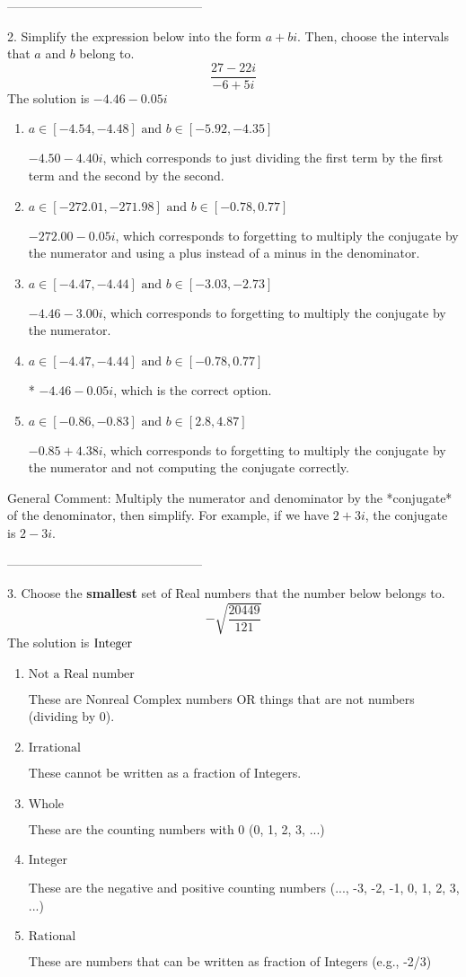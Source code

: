 \documentclass{extbook}[14pt]
\begin{document}
-----------------------------------------------

2. Simplify the expression below into the form $a+bi$. Then, choose the intervals that $a$ and $b$ belong to.
\[ \frac{27  - 22 i}{-6  + 5 i} \] 
The solution is $ -4.46  - 0.05 i $ 

\begin{enumerate}[label=\Alph*.] 
\item $ a \in [-4.54, -4.48] \text{ and } b \in [-5.92, -4.35] $ 

  $-4.50  - 4.40 i$, which corresponds to just dividing the first term by the first term and the second by the second. 
\item $ a \in [-272.01, -271.98] \text{ and } b \in [-0.78, 0.77] $ 

  $-272.00  - 0.05 i$, which corresponds to forgetting to multiply the conjugate by the numerator and using a plus instead of a minus in the denominator. 
\item $ a \in [-4.47, -4.44] \text{ and } b \in [-3.03, -2.73] $ 

  $-4.46  - 3.00 i$, which corresponds to forgetting to multiply the conjugate by the numerator. 
\item $ a \in [-4.47, -4.44] \text{ and } b \in [-0.78, 0.77] $ 

 * $-4.46  - 0.05 i$, which is the correct option. 
\item $ a \in [-0.86, -0.83] \text{ and } b \in [2.8, 4.87] $ 

  $-0.85  + 4.38 i$, which corresponds to forgetting to multiply the conjugate by the numerator and not computing the conjugate correctly. 
\end{enumerate} 
 
General Comment: Multiply the numerator and denominator by the *conjugate* of the denominator, then simplify. For example, if we have $2+3i$, the conjugate is $2-3i$.

-----------------------------------------------

3. Choose the \textbf{smallest} set of Real numbers that the number below belongs to.
\[ -\sqrt{\frac{20449}{121}} \] 
The solution is $ \text{\text{Integer}} $ 

\begin{enumerate}[label=\Alph*.] 
\item $ \text{Not a Real number} $ 

 These are Nonreal Complex numbers OR things that are not numbers (dividing by 0). 
\item $ \text{Irrational} $ 

 These cannot be written as a fraction of Integers. 
\item $ \text{Whole} $ 

 These are the counting numbers with 0 (0, 1, 2, 3, ...) 
\item $ \text{Integer} $ 

 These are the negative and positive counting numbers (..., -3, -2, -1, 0, 1, 2, 3, ...) 
\item $ \text{Rational} $ 

 These are numbers that can be written as fraction of Integers (e.g., -2/3) 
\end{enumerate} 
 
\end{document}
